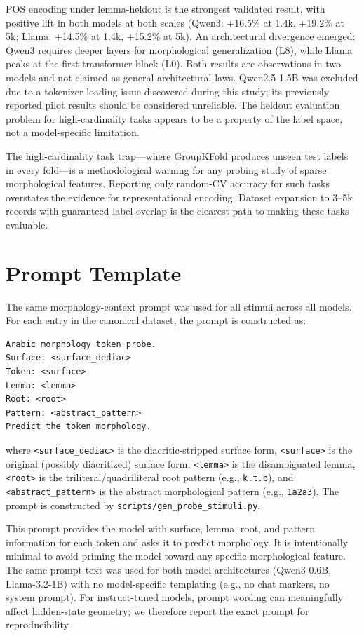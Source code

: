 \documentclass[11pt,a4paper]{article}
\begin{document}
POS encoding under lemma-heldout is the strongest validated result, with positive lift in both models at both scales (Qwen3: +16.5\% at 1.4k, +19.2\% at 5k; Llama: +14.5\% at 1.4k, +15.2\% at 5k). An architectural divergence emerged: Qwen3 requires deeper layers for morphological generalization (L8), while Llama peaks at the first transformer block (L0). Both results are observations in two models and not claimed as general architectural laws. Qwen2.5-1.5B was excluded due to a tokenizer loading issue discovered during this study; its previously reported pilot results should be considered unreliable. The heldout evaluation problem for high-cardinality tasks appears to be a property of the label space, not a model-specific limitation.

The high-cardinality task trap---where GroupKFold produces unseen test labels in every fold---is a methodological warning for any probing study of sparse morphological features. Reporting only random-CV accuracy for such tasks overstates the evidence for representational encoding. Dataset expansion to 3--5k records with guaranteed label overlap is the clearest path to making these tasks evaluable.

\appendix

\section{Prompt Template}\label{sec:appendix-prompt}
The same morphology-context prompt was used for all stimuli across all models. For each entry in the canonical dataset, the prompt is constructed as:

\begin{verbatim}
Arabic morphology token probe.
Surface: <surface_dediac>
Token: <surface>
Lemma: <lemma>
Root: <root>
Pattern: <abstract_pattern>
Predict the token morphology.
\end{verbatim}

where \texttt{<surface\_dediac>} is the diacritic-stripped surface form, \texttt{<surface>} is the original (possibly diacritized) surface form, \texttt{<lemma>} is the disambiguated lemma, \texttt{<root>} is the triliteral/quadriliteral root pattern (e.g., \texttt{k.t.b}), and \texttt{<abstract\_pattern>} is the abstract morphological pattern (e.g., \texttt{1a2a3}). The prompt is constructed by \texttt{scripts/gen\_probe\_stimuli.py}.

This prompt provides the model with surface, lemma, root, and pattern information for each token and asks it to predict morphology. It is intentionally minimal to avoid priming the model toward any specific morphological feature. The same prompt text was used for both model architectures (Qwen3-0.6B, Llama-3.2-1B) with no model-specific templating (e.g., no chat markers, no system prompt). For instruct-tuned models, prompt wording can meaningfully affect hidden-state geometry; we therefore report the exact prompt for reproducibility.
\end{document}
